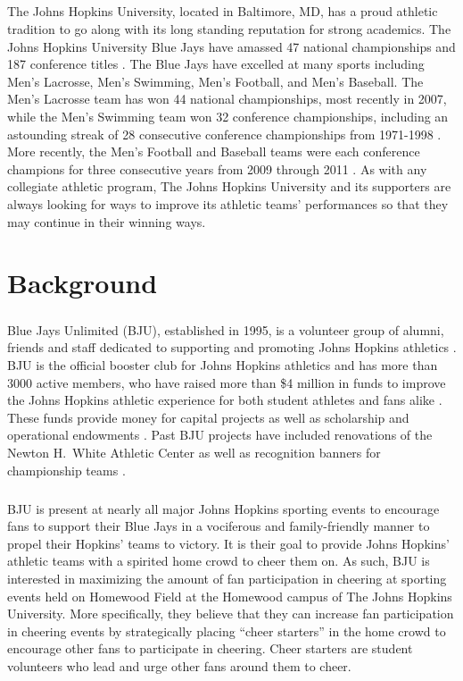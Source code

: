 \documentclass[oneside,12pt]{report}
\def\prefacesection#1{
\chapter*{#1}
\addcontentsline{toc}{chapter}{#1}
}
\begin{document}
\paragraph{}
The Johns Hopkins University, located in Baltimore, MD, has a proud athletic tradition to go along with its long standing reputation for strong academics. The Johns Hopkins University Blue Jays have amassed 47 national championships and 187 conference titles \cite{hopathletic}. The Blue Jays have excelled at many sports including Men's Lacrosse, Men's Swimming, Men's Football, and Men's Baseball. The Men's Lacrosse team has won 44 national championships, most recently in 2007, while the Men's Swimming team won 32 conference championships, including an astounding streak of 28 consecutive conference championships from 1971-1998 \cite{hopathletic}. More recently, the Men's Football and Baseball teams were each conference champions for three consecutive years from 2009 through 2011 \cite{hopathletic}. As with any collegiate athletic program, The Johns Hopkins University and its supporters are always looking for ways to improve its athletic teams' performances so that they may continue in their winning ways.

\prefacesection{Background}
\paragraph{} 
Blue Jays Unlimited (BJU), established in 1995, is a volunteer group of alumni, friends and staff dedicated to supporting and promoting Johns Hopkins athletics \cite{bjuwebsite}. BJU is the official booster club for Johns Hopkins athletics and has more than 3000 active members, who have raised more than \$4 million in funds to improve the Johns Hopkins athletic experience for both student athletes and fans alike \cite{bjuwebsite}. These funds provide money for capital projects as well as scholarship and operational endowments \cite{bjuwebsite}. Past BJU projects have included renovations of the Newton H.~White Athletic Center as well as recognition banners for championship teams \cite{bjuwebsite}.

\paragraph{}
BJU is present at nearly all major Johns Hopkins sporting events to encourage fans to support their Blue Jays in a vociferous and family-friendly manner to propel their Hopkins' teams to victory. It is their goal to provide Johns Hopkins' athletic teams with a spirited home crowd to cheer them on. As such, BJU is interested in maximizing the amount of fan participation in cheering at sporting events held on Homewood Field at the Homewood campus of The Johns Hopkins University. More specifically, they believe that they can increase fan participation in cheering events by strategically placing ``cheer starters'' in the home crowd to encourage other fans to participate in cheering. Cheer starters are student volunteers who lead and urge other fans around them to cheer.
\end{document}
